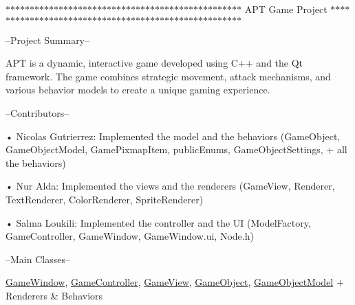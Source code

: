 \label{index_md_README}%
%
 $\ast$$\ast$$\ast$$\ast$$\ast$$\ast$$\ast$$\ast$$\ast$$\ast$$\ast$$\ast$$\ast$$\ast$$\ast$$\ast$$\ast$$\ast$$\ast$$\ast$$\ast$$\ast$$\ast$$\ast$$\ast$$\ast$$\ast$$\ast$$\ast$$\ast$$\ast$$\ast$$\ast$$\ast$$\ast$$\ast$$\ast$$\ast$$\ast$$\ast$$\ast$$\ast$$\ast$$\ast$$\ast$$\ast$$\ast$$\ast$$\ast$ APT Game Project $\ast$$\ast$$\ast$$\ast$$\ast$$\ast$$\ast$$\ast$$\ast$$\ast$$\ast$$\ast$$\ast$$\ast$$\ast$$\ast$$\ast$$\ast$$\ast$$\ast$$\ast$$\ast$$\ast$$\ast$$\ast$$\ast$$\ast$$\ast$$\ast$$\ast$$\ast$$\ast$$\ast$$\ast$$\ast$$\ast$$\ast$$\ast$$\ast$$\ast$$\ast$$\ast$$\ast$$\ast$$\ast$$\ast$$\ast$$\ast$$\ast$$\ast$$\ast$$\ast$$\ast$

--Project Summary--

APT is a dynamic, interactive game developed using C++ and the Qt framework. The game combines strategic movement, attack mechanisms, and various behavior models to create a unique gaming experience.

--Contributors-- \begin{DoxyVerb}• Nicolas Gutrierrez: Implemented the model and the behaviors (GameObject, GameObjectModel, GamePixmapItem, publicEnums, GameObjectSettings, + all the behaviors)

• Nur Alda: Implemented the views and the renderers (GameView, Renderer, TextRenderer, ColorRenderer, SpriteRenderer)

• Salma Loukili: Implemented the controller and the UI (ModelFactory, GameController, GameWindow, GameWindow.ui, Node.h)
\end{DoxyVerb}


--Main Classes--

\mbox{\hyperlink{classGameWindow}{Game\+Window}}, \mbox{\hyperlink{classGameController}{Game\+Controller}}, \mbox{\hyperlink{classGameView}{Game\+View}}, \mbox{\hyperlink{classGameObject}{Game\+Object}}, \mbox{\hyperlink{classGameObjectModel}{Game\+Object\+Model}} + Renderers \& Behaviors

